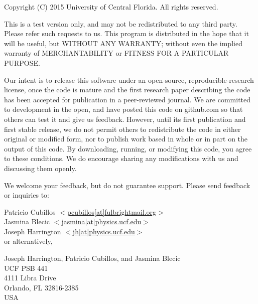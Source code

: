 \documentclass[letterpaper, 12pt]{article}
\begin{document}
Copyright (C) 2015 University of Central Florida.  All rights
reserved. \newline

This is a test version only, and may not be redistributed to any third
party.  Please refer such requests to us.  This program is distributed
in the hope that it will be useful, but WITHOUT ANY WARRANTY; without
even the implied warranty of MERCHANTABILITY or FITNESS FOR A
PARTICULAR PURPOSE. \newline

Our intent is to release this software under an open-source,
reproducible-research license, once the code is mature and the first
research paper describing the code has been accepted for publication
in a peer-reviewed journal.  We are committed to development in the
open, and have posted this code on github.com so that others can test
it and give us feedback.  However, until its first publication and
first stable release, we do not permit others to redistribute the code
in either original or modified form, nor to publish work based in
whole or in part on the output of this code.  By downloading, running,
or modifying this code, you agree to these conditions.  We do
encourage sharing any modifications with us and discussing them
openly. \newline

\noindent We welcome your feedback, but do not guarantee support.
Please send feedback or inquiries to: \newline

\noindent Patricio Cubillos $<$\href{mailto:pcubillos@fulbrightmail.org}
                                    {pcubillos[at]fulbrightmail.org}$>$  \\
\noindent Jasmina Blecic    $<$\href{jasmina@physics.ucf.edu}
                                    {jasmina[at]physics.ucf.edu}$>$   \\
\noindent Joseph Harrington $<$\href{jh@physics.ucf.edu}
                                    {jh[at]physics.ucf.edu}$>$  \\


\noindent or alternatively, \newline

\noindent Joseph Harrington, Patricio Cubillos, and Jasmina Blecic \\
UCF PSB 441            \\
4111 Libra Drive       \\
Orlando, FL 32816-2385 \\
USA                    \\
\end{document}
